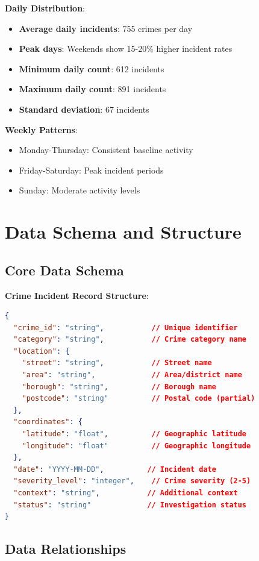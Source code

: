 \documentclass[12pt,a4paper]{article}
\begin{document}
\textbf{Daily Distribution}:
\begin{itemize}
    \item \textbf{Average daily incidents}: 755 crimes per day
    \item \textbf{Peak days}: Weekends show 15-20\% higher incident rates
    \item \textbf{Minimum daily count}: 612 incidents
    \item \textbf{Maximum daily count}: 891 incidents
    \item \textbf{Standard deviation}: 67 incidents
\end{itemize}

\textbf{Weekly Patterns}:
\begin{itemize}
    \item Monday-Thursday: Consistent baseline activity
    \item Friday-Saturday: Peak incident periods
    \item Sunday: Moderate activity levels
\end{itemize}

\section{Data Schema and Structure}

\subsection{Core Data Schema}

\textbf{Crime Incident Record Structure}:
\begin{lstlisting}[language=json, caption=JSON Data Schema]
{
  "crime_id": "string",           // Unique identifier
  "category": "string",           // Crime category name
  "location": {
    "street": "string",           // Street name
    "area": "string",             // Area/district name
    "borough": "string",          // Borough name
    "postcode": "string"          // Postal code (partial)
  },
  "coordinates": {
    "latitude": "float",          // Geographic latitude
    "longitude": "float"          // Geographic longitude
  },
  "date": "YYYY-MM-DD",          // Incident date
  "severity_level": "integer",    // Crime severity (2-5)
  "context": "string",           // Additional context
  "status": "string"             // Investigation status
}
\end{lstlisting}

\subsection{Data Relationships}
\end{document}
